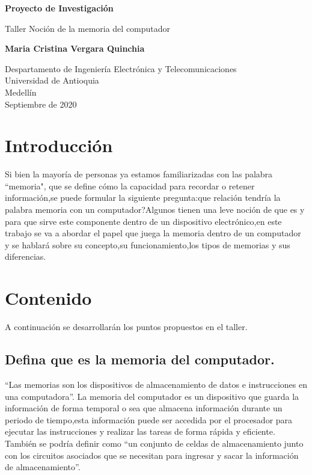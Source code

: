 \documentclass{article}
\begin{document}
\begin{titlepage}
    \begin{center}
        \vspace*{1cm}
            
        \Huge
        \textbf{Proyecto de Investigación}
            
        \vspace{0.5cm}
        \LARGE
        Taller Noción de la memoria del computador
            
        \vspace{1.5cm}
            
        \textbf{Maria Cristina Vergara Quinchia}
            
        \vfill
            
        \vspace{0.8cm}
            
        \Large
        Despartamento de Ingeniería Electrónica y Telecomunicaciones\\
        Universidad de Antioquia\\
        Medellín\\
        Septiembre de 2020
            
    \end{center}
\end{titlepage}

\tableofcontents
\newpage
\section{Introducción}\label{intro}
Si bien la mayoría de personas ya estamos familiarizadas con las palabra  “memoria", que se  define cómo la capacidad para recordar o retener información,se puede formular la siguiente pregunta:que relación tendría la palabra memoria con un computador?Algunos tienen una leve noción de que es y para que sirve este componente dentro de un dispositivo electrónico,en este trabajo se va a abordar el papel que juega la memoria dentro de un computador y se hablará sobre su concepto,su funcionamiento,los tipos de memorias y sus diferencias.
\section{Contenido}\label{contenido}
A continuación se desarrollarán los puntos propuestos en el taller.

\subsection{Defina que es la memoria del computador.}
 “Las memorias son los dispositivos de almacenamiento de datos e instrucciones en una computadora”\cite{UNT}.
La memoria del computador es un dispositivo que guarda la información de forma temporal o sea que almacena información durante un periodo de tiempo,esta información puede ser accedida  por el procesador para ejecutar las instrucciones y realizar las tareas de forma rápida y eficiente.
También se podría definir como “un conjunto de celdas de almacenamiento junto con los circuitos asociados que se necesitan para ingresar y sacar la información de almacenamiento”\cite{FIng}.
\end{document}
